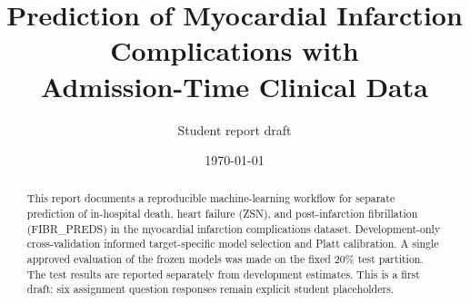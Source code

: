 \documentclass[11pt,a4paper]{article}
\title{Prediction of Myocardial Infarction Complications with\\Admission-Time Clinical Data}
\author{Student report draft}
\date{\today}
\begin{document}
\maketitle
\begin{abstract}
This report documents a reproducible machine-learning workflow for separate prediction of in-hospital death, heart failure (ZSN), and post-infarction fibrillation (FIBR\_PREDS) in the myocardial infarction complications dataset. Development-only cross-validation informed target-specific model selection and Platt calibration. A single approved evaluation of the frozen models was made on the fixed 20\% test partition. The test results are reported separately from development estimates. This is a first draft: six assignment question responses remain explicit student placeholders.
\end{abstract}
\tableofcontents










\end{document}
